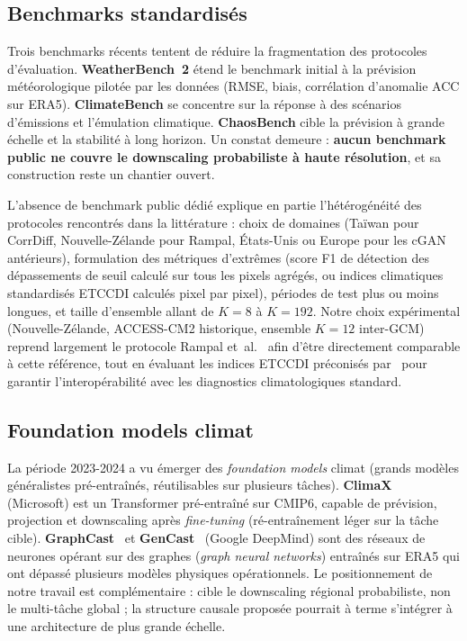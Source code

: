 \subsection{Benchmarks standardisés}
\label{ssec:soa-benchmarks-std}

Trois benchmarks récents tentent de réduire la fragmentation des protocoles d'évaluation. \textbf{WeatherBench~2} étend le benchmark initial à la prévision météorologique pilotée par les données (RMSE, biais, corrélation d'anomalie ACC sur ERA5). \textbf{ClimateBench} se concentre sur la réponse à des scénarios d'émissions et l'émulation climatique. \textbf{ChaosBench} cible la prévision à grande échelle et la stabilité à long horizon. Un constat demeure : \textbf{aucun benchmark public ne couvre le downscaling probabiliste à haute résolution}, et sa construction reste un chantier ouvert.

L'absence de benchmark public dédié explique en partie l'hétérogénéité des protocoles rencontrés dans la littérature : choix de domaines (Taïwan pour CorrDiff, Nouvelle-Zélande pour Rampal, États-Unis ou Europe pour les cGAN antérieurs), formulation des métriques d'extrêmes (score F1 de détection des dépassements de seuil calculé sur tous les pixels agrégés, ou indices climatiques standardisés ETCCDI calculés pixel par pixel), périodes de test plus ou moins longues, et taille d'ensemble allant de $K=8$ à $K=192$. Notre choix expérimental (Nouvelle-Zélande, ACCESS-CM2 historique, ensemble $K=12$ inter-GCM) reprend largement le protocole Rampal et~al.~\cite{rampal_cgan_2024} afin d'être directement comparable à cette référence, tout en évaluant les indices ETCCDI préconisés par~\cite{zhang_etccdi_2011} pour garantir l'interopérabilité avec les diagnostics climatologiques standard.

\subsection{Foundation models climat}
\label{ssec:soa-foundation}

La période 2023-2024 a vu émerger des \emph{foundation models} climat (grands modèles généralistes pré-entraînés, réutilisables sur plusieurs tâches). \textbf{ClimaX}~\cite{nguyen_climax_2023} (Microsoft) est un Transformer pré-entraîné sur CMIP6, capable de prévision, projection et downscaling après \emph{fine-tuning} (ré-entraînement léger sur la tâche cible). \textbf{GraphCast}~\cite{lam_graphcast_2023} et \textbf{GenCast}~\cite{price_gencast_2024} (Google DeepMind) sont des réseaux de neurones opérant sur des graphes (\emph{graph neural networks}) entraînés sur ERA5 qui ont dépassé plusieurs modèles physiques opérationnels. Le positionnement de notre travail est complémentaire : \Oracle{} cible le downscaling régional probabiliste, non le multi-tâche global ; la structure causale proposée pourrait à terme s'intégrer à une architecture de plus grande échelle.

